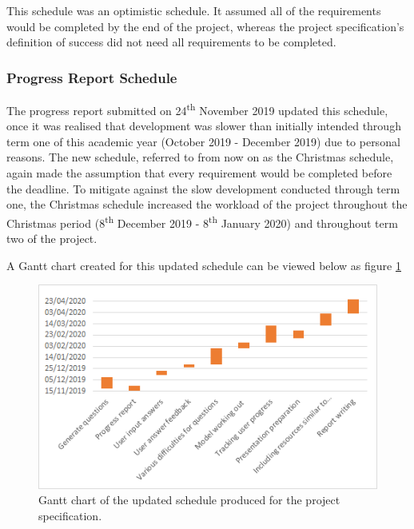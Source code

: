 \documentclass{article}
\begin{document}
This schedule was an optimistic schedule. It assumed all of the requirements would be completed by the end of the project, whereas the project specification's definition of success did not need all requirements to be completed. 

%
%
%
%
%

\subsubsection{Progress Report Schedule}

The progress report submitted on 24\textsuperscript{th} November 2019 updated this schedule, once it was realised that development was slower than initially intended through term one of this academic year (October 2019 - December 2019) due to personal reasons. The new schedule, referred to from now on as the Christmas schedule, again made the assumption that every requirement would be completed before the deadline. To mitigate against the slow development conducted through term one, the Christmas schedule increased the workload of the project throughout the Christmas period (8\textsuperscript{th} December 2019 - 8\textsuperscript{th} January 2020) and throughout term two of the project. \par

A Gantt chart created for this updated schedule can be viewed below as figure \ref{figure:progressReportGanttChart}

\begin{figure}[H]
	\centering
	\includegraphics[width=\linewidth]{./data/progressReportGanttChart.png}
	\caption{Gantt chart of the updated schedule produced for the project specification.}
	\label{figure:progressReportGanttChart}
\end{figure}
\end{document}
